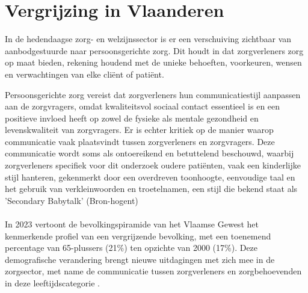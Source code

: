 \section{Vergrijzing in Vlaanderen}


In de hedendaagse zorg- en welzijnssector is er een verschuiving zichtbaar van aanbodgestuurde naar persoonsgerichte zorg. Dit houdt in dat zorgverleners zorg op maat bieden, rekening houdend met de unieke behoeften, voorkeuren, wensen en verwachtingen van elke cliënt of patiënt. 

Persoonsgerichte zorg vereist dat zorgverleners hun communicatiestijl aanpassen aan de zorgvragers, omdat kwaliteitsvol sociaal contact essentieel is en een positieve invloed heeft op zowel de fysieke als mentale gezondheid en levenskwaliteit van zorgvragers.
Er is echter kritiek op de manier waarop communicatie vaak plaatsvindt tussen zorgverleners en zorgvragers. Deze communicatie wordt soms als ontoereikend en betuttelend beschouwd, waarbij zorgverleners specifiek voor dit onderzoek oudere patiënten, vaak een kinderlijke stijl hanteren, gekenmerkt door een overdreven toonhoogte, eenvoudige taal en het gebruik van verkleinwoorden en troetelnamen, een stijl die bekend staat als 'Secondary Babytalk' (Bron-hogent)
\\
\\
In 2023 vertoont de bevolkingspiramide van het Vlaamse Gewest het kenmerkende profiel van een vergrijzende bevolking, met een toenemend percentage van 65-plussers (21\%) ten opzichte van 2000 (17\%). Deze demografische verandering brengt nieuwe uitdagingen met zich mee in de zorgsector, met name de communicatie tussen zorgverleners en zorgbehoevenden in deze leeftijdscategorie \autocite{Vlaanderen.be}. 

